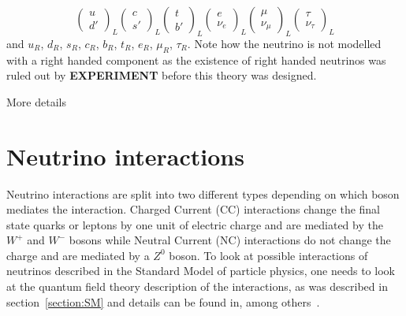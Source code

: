 \begin{equation}
\begin{pmatrix}
    u\\
    d'
\end{pmatrix}_L
\begin{pmatrix}
    c\\
    s'
\end{pmatrix}_L
\begin{pmatrix}
    t\\
    b'
\end{pmatrix}_L
\begin{pmatrix}
    e\\
    \nu_e
\end{pmatrix}_L
\begin{pmatrix}
    \mu\\
    \nu_\mu
\end{pmatrix}_L
\begin{pmatrix}
    \tau\\
    \nu_\tau
\end{pmatrix}_L
\end{equation}
and $u_R$,  $d_R$, $s_R$, $c_R$, $b_R$, $t_R$, $e_R$, $\mu_R$, $\tau_R$. 
Note how the neutrino is not modelled with a right handed component as the existence of right handed neutrinos was ruled out by \textbf{EXPERIMENT} before this theory was designed.

More details
\fi

\pagebreak

\section{Neutrino interactions}\label{subsection:Neutrino interactions}

Neutrino interactions are split into two different types depending on which boson mediates the interaction.
Charged Current (CC) interactions change the final state quarks or leptons by one unit of electric charge and are mediated by the $W^+$ and $W^-$ bosons while Neutral Current (NC) interactions do not change the charge and are mediated by a $Z^0$ boson. 
To look at possible interactions of neutrinos described in the Standard Model of particle physics, one needs to look at the quantum field theory description of the interactions, as was described in section~\ref{section:SM} and details can be found in, among others~\cite{3Peskin, 2Hallsjo}.  %

